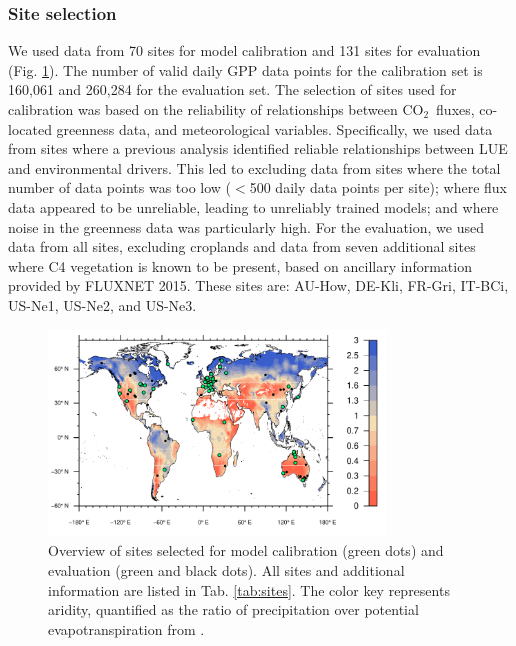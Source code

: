 \documentclass{myreport}
\newcommand{\coo}{CO$_2$}
\begin{document}
\label{sec:calibdata}

\subsubsection{Site selection}
We used data from 70 sites for model calibration and 131 sites for evaluation (Fig. \ref{fig:map_sites}). The number of valid daily GPP data points for the calibration set is 160,061 and 260,284 for the evaluation set. The selection of sites used for calibration was based on the reliability of relationships between \coo\ fluxes, co-located greenness data, and meteorological variables. Specifically, we used data from sites where a previous analysis \citep{stocker18newphyt} identified reliable relationships between LUE and environmental drivers. This led to excluding data from sites where the total number of data points was too low ($<$500 daily data points per site); where flux data appeared to be unreliable, leading to unreliably trained models; and where noise in the greenness data was particularly high. For the evaluation, we used data from all sites, excluding croplands and data from seven additional sites where C4 vegetation is known to be present, based on ancillary information provided by FLUXNET 2015. These sites are: AU-How, DE-Kli, FR-Gri, IT-BCi, US-Ne1, US-Ne2, and US-Ne3.

\begin{figure}[!ht]
    \centering
    \includegraphics[width=0.8\textwidth]{fig/map_sites.pdf}
    \caption{Overview of sites selected for model calibration (green dots) and evaluation (green and black dots). All sites and additional information are listed in Tab. \ref{tab:sites}. The color key represents aridity, quantified as the ratio of precipitation over potential evapotranspiration from \cite{greve14}.}
    \label{fig:map_sites}
\end{figure}
\end{document}
